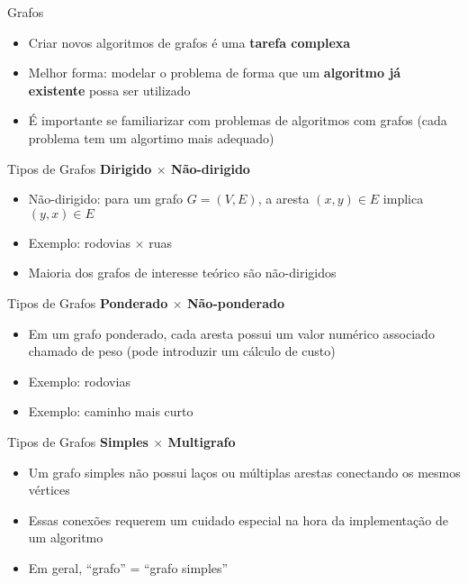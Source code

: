 \documentclass[10pt]{beamer}
\begin{document}
\begin{frame}{Grafos}
  \Large
  \begin{itemize}
    \item Criar novos algoritmos de grafos é uma \textbf{tarefa complexa}
    \item Melhor forma: modelar o problema de forma que um \textbf{algoritmo já existente} possa ser utilizado
    \item É importante se familiarizar com problemas de algoritmos com grafos (cada problema tem um algortimo mais adequado)
  \end{itemize}
\end{frame}

\begin{frame}{Tipos de Grafos}
  \vfill
  \centering
  \huge \textbf{Dirigido $\times$ Não-dirigido}
  \vfill
  \raggedright
  \large
  \begin{itemize}
    \item Não-dirigido: para um grafo $G = (V, E)$, a aresta $(x, y) \in E$ implica $(y, x) \in E$
    \item Exemplo: rodovias $\times$ ruas
    \item Maioria dos grafos de interesse teórico são não-dirigidos
  \end{itemize}
\end{frame}

\begin{frame}{Tipos de Grafos}
  \vfill
  \centering
  \huge \textbf{Ponderado $\times$ Não-ponderado}
  \vfill
  \raggedright
  \large
  \begin{itemize}
    \item Em um grafo ponderado, cada aresta possui um valor numérico associado chamado de peso (pode introduzir um cálculo de custo)
    \item Exemplo: rodovias
    \item Exemplo: caminho mais curto
  \end{itemize}
\end{frame}

\begin{frame}{Tipos de Grafos}
  \vfill
  \centering
  \huge \textbf{Simples $\times$ Multigrafo}
  \vfill
  \raggedright
  \large
  \begin{itemize}
    \item Um grafo simples não possui laços ou múltiplas arestas conectando os mesmos vértices
    \item Essas conexões requerem um cuidado especial na hora da implementação de um algoritmo
    \item Em geral, ``grafo'' = ``grafo simples''
  \end{itemize}
\end{frame}
\end{document}
